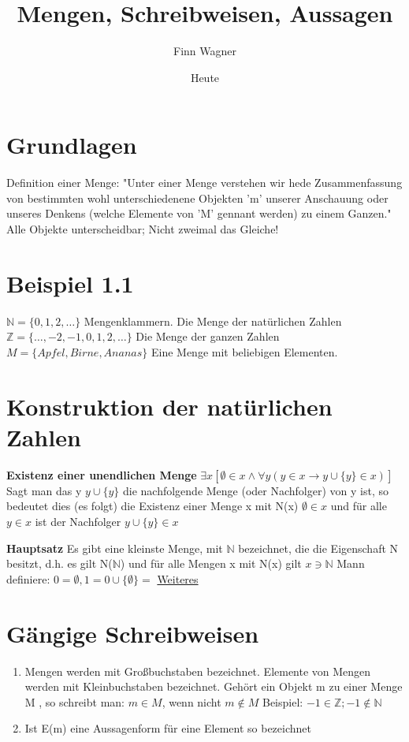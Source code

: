 \documentclass{article}
\title{Mengen, Schreibweisen, Aussagen}
\author{Finn Wagner}
\date{Heute}
\begin{document}
\maketitle

\section{Grundlagen}
Definition einer Menge: "Unter einer Menge verstehen wir hede Zusammenfassung
von bestimmten wohl unterschiedenene Objekten 'm' unserer Anschauung oder
unseres Denkens (welche Elemente von 'M' gennant werden) zu einem Ganzen."
Alle Objekte unterscheidbar; Nicht zweimal das Gleiche!

\section{Beispiel 1.1}
$\mathbb{N}=\{0, 1, 2, \ldots\}$
Mengenklammern. Die Menge der natürlichen Zahlen
$\mathbb{Z}=\{\ldots, -2, -1, 0, 1, 2, \ldots\}$
Die Menge der ganzen Zahlen
$M = \{Apfel, Birne, Ananas\}$
Eine Menge mit beliebigen Elementen.

\section{Konstruktion der natürlichen Zahlen}
\textbf{Existenz einer unendlichen Menge}
$\exists x [\emptyset \in x \land \forall y (y \in x \rightarrow y \cup \{y\} \in x)]$\\
Sagt man das y $y \cup \{y\}$ die nachfolgende Menge (oder Nachfolger) von y
ist, so bedeutet dies (es folgt) die Existenz einer Menge x mit
N(x) $\emptyset \in x$ und für alle $y \in x$ ist der Nachfolger $y \cup \{y\}\in x$

\textbf{Hauptsatz}
Es gibt eine kleinste Menge, mit $\mathbb{N}$ bezeichnet, die
die Eigenschaft N besitzt, d.h. es gilt N($\mathbb{N}$) und für alle
Mengen x mit N(x) gilt $x \ni \mathbb{N}$
Mann definiere: $0=\emptyset, 1=0\cup\{\emptyset\}=$
\href{https://www.mathematik.uni-marburg.de/~portenier/Analyse/Skript/nat-zahlen.pdf}{Weiteres}

\section{Gängige Schreibweisen}
\begin{enumerate}
    \item Mengen werden mit Großbuchstaben bezeichnet. Elemente von Mengen werden
    mit Kleinbuchstaben bezeichnet.
    Gehört ein Objekt m zu einer Menge M , so schreibt man:
    $m \in M$, wenn nicht $m \notin M$
    Beispiel: $-1 \in \mathbb{Z}; -1 \notin \mathbb{N}$
    \item Ist E(m) eine Aussagenform für eine Element so bezeichnet


\end{enumerate}
\end{document}
